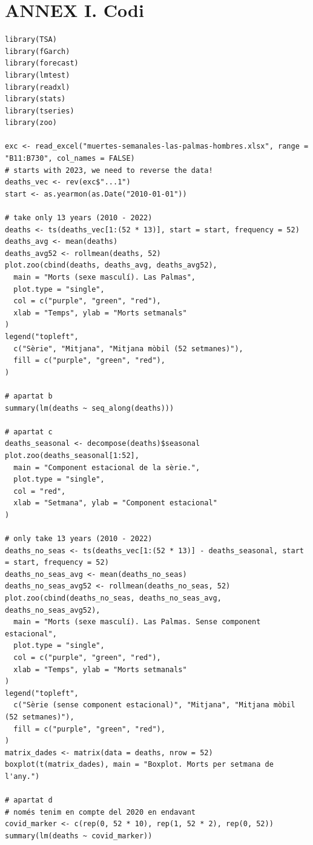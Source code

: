 \documentclass[a4paper, 11pt]{article}
\begin{document}
\newpage

\section*{ANNEX I. Codi}

\begin{verbatim}
library(TSA)
library(fGarch)
library(forecast)
library(lmtest)
library(readxl)
library(stats)
library(tseries)
library(zoo)

exc <- read_excel("muertes-semanales-las-palmas-hombres.xlsx", range = "B11:B730", col_names = FALSE)
# starts with 2023, we need to reverse the data!
deaths_vec <- rev(exc$"...1")
start <- as.yearmon(as.Date("2010-01-01"))

# take only 13 years (2010 - 2022)
deaths <- ts(deaths_vec[1:(52 * 13)], start = start, frequency = 52)
deaths_avg <- mean(deaths)
deaths_avg52 <- rollmean(deaths, 52)
plot.zoo(cbind(deaths, deaths_avg, deaths_avg52),
  main = "Morts (sexe masculí). Las Palmas",
  plot.type = "single",
  col = c("purple", "green", "red"),
  xlab = "Temps", ylab = "Morts setmanals"
)
legend("topleft",
  c("Sèrie", "Mitjana", "Mitjana mòbil (52 setmanes)"),
  fill = c("purple", "green", "red"),
)

# apartat b
summary(lm(deaths ~ seq_along(deaths)))

# apartat c
deaths_seasonal <- decompose(deaths)$seasonal
plot.zoo(deaths_seasonal[1:52],
  main = "Component estacional de la sèrie.",
  plot.type = "single",
  col = "red",
  xlab = "Setmana", ylab = "Component estacional"
)

# only take 13 years (2010 - 2022)
deaths_no_seas <- ts(deaths_vec[1:(52 * 13)] - deaths_seasonal, start = start, frequency = 52)
deaths_no_seas_avg <- mean(deaths_no_seas)
deaths_no_seas_avg52 <- rollmean(deaths_no_seas, 52)
plot.zoo(cbind(deaths_no_seas, deaths_no_seas_avg, deaths_no_seas_avg52),
  main = "Morts (sexe masculí). Las Palmas. Sense component estacional",
  plot.type = "single",
  col = c("purple", "green", "red"),
  xlab = "Temps", ylab = "Morts setmanals"
)
legend("topleft",
  c("Sèrie (sense component estacional)", "Mitjana", "Mitjana mòbil (52 setmanes)"),
  fill = c("purple", "green", "red"),
)
matrix_dades <- matrix(data = deaths, nrow = 52)
boxplot(t(matrix_dades), main = "Boxplot. Morts per setmana de l'any.")

# apartat d
# només tenim en compte del 2020 en endavant
covid_marker <- c(rep(0, 52 * 10), rep(1, 52 * 2), rep(0, 52))
summary(lm(deaths ~ covid_marker))


\end{verbatim}
\end{document}
